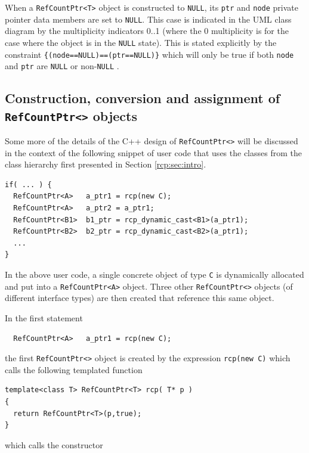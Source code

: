When a {}\texttt{Ref\-Count\-Ptr<T>} object is constructed to
{}\texttt{NULL}, its {}\texttt{ptr} and {}\texttt{node} private
pointer data members are set to {}\texttt{NULL}.  This case is
indicated in the UML class diagram by the multiplicity indicators 0..1
(where the 0 multiplicity is for the case where the object is in the
{}\texttt{NULL} state).  This is stated explicitly by the constraint
{}\texttt{\{(node==NULL)==(ptr==NULL)\}} which will only be true if
both {}\texttt{node} and {}\texttt{ptr} are {}\texttt{NULL} or
non-{}\texttt{NULL} .

%
\subsection{Construction, conversion and assignment of {}\texttt{Ref\-Count\-Ptr<>} objects}
%

Some more of the details of the C++ design of
{}\texttt{Ref\-Count\-Ptr<>} will be discussed in the context of the
following snippet of user code that uses the classes from the class
hierarchy first presented in Section {}\ref{rcp:sec:intro}.

{\scriptsize\begin{verbatim}
if( ... ) {
  RefCountPtr<A>   a_ptr1 = rcp(new C);
  RefCountPtr<A>   a_ptr2 = a_ptr1;
  RefCountPtr<B1>  b1_ptr = rcp_dynamic_cast<B1>(a_ptr1);
  RefCountPtr<B2>  b2_ptr = rcp_dynamic_cast<B2>(a_ptr1);
  ...
}
\end{verbatim}}

{}\noindent{}In the above user code, a single concrete object of type
{}\texttt{C} is dynamically allocated and put into a
{}\texttt{Ref\-Count\-Ptr<A>} object.  Three other
{}\texttt{Ref\-Count\-Ptr<>} objects (of different interface types)
are then created that reference this same object.

In the first statement

{\scriptsize\begin{verbatim}
  RefCountPtr<A>   a_ptr1 = rcp(new C);
\end{verbatim}}

{}\noindent{}the first {}\texttt{Ref\-Count\-Ptr<>} object is created
by the expression {}\texttt{rcp(new C)} which calls the following
templated function

{\scriptsize\begin{verbatim}
template<class T> RefCountPtr<T> rcp( T* p )
{
  return RefCountPtr<T>(p,true);
}
\end{verbatim}}

{}\noindent{}which calls the constructor

